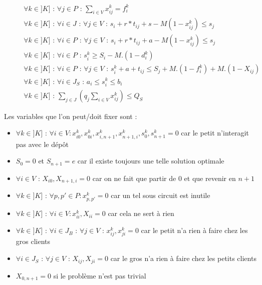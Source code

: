 \documentclass[12pt,a4paper,fleqn]{article}
\begin{document}
\begin{align}
& && \forall k \in ]K] \text{ : } \forall j \in P \text{ : } \sum \limits_{i \in V} x^k_{ij} = f^k_i \label{reveniraugros} \\
& && \forall k \in ]K] \text{ : } \forall i \in J \text{ : } \forall j \in V \text{ : } s_i + r*t_{ij} + s - M(1-x_{ij}^k) \leqslant s_j \label{sequentialitepetit1} \\
& && \forall k \in ]K] \text{ : } \forall i \in P \text{ : } \forall j \in V \text{ : } s_i + r*t_{ij} + a - M(1-x_{ij}^k) \leqslant s_j \label{sequentialitepetit2} \\
& && \forall k \in ]K] \text{ : } \forall i \in P \text{ : } s_i^k \geqslant S_i - M.(1 - d_i^k) \label{datedebutpetit} \\
& && \forall k \in ]K] \text{ : } \forall i \in P \text{ : } \forall j \in V \text{ : } s_i^k + a + t_{ij} \leqslant S_j + M.(1 - f^k_i) + M.(1 - X_{ij}) \label{datedefinpetit} \\
& && \forall k \in ]K] \text{ : } \forall i \in J_S \text{ : } a_i \leqslant s_i^k \leqslant b_i \label{fenetrepetit} \\
& && \forall k \in ]K] \text{ : } \sum \limits_{j \in J} (q_j \sum \limits_{i \in V} x^k_{ij}) \leqslant Q_S  \label{capa} 
\end{align}

\clearpage

Les variables que l'on peut/doit fixer sont :
\begin{itemize}
\item $\forall k \in ]K] \text{ : } \forall i \in V : x^k_{i0}, x^k_{0i}, x^k_{i,n+1}, x^k_{n+1,i}, s^k_0, s^k_{n+1} = 0$ car le petit n'interagit pas avec le dépôt
\item $S_0 = 0$ et $S_{n+1} = e$ car il existe toujours une telle solution optimale
\item $\forall i \in V \text{ : } X_{i0}, X_{n+1,i} = 0$ car on ne fait que partir de $0$ et que revenir en $n+1$
\item $\forall k \in ]K] \text{ : } \forall p,p' \in P : x^k_{p,p'} = 0$ car un tel sous circuit est inutile
\item $\forall k \in ]K] \text{ : } \forall i \in V : x^k_{ii}, X_{ii} = 0$ car cela ne sert à rien
\item $\forall k \in ]K] \text{ : } \forall i \in J_B \text{ : } \forall j \in V \text{ : } x^k_{ij}, x^k_{ji} = 0$ car le petit n'a rien à faire chez les gros clients
\item $\forall i \in J_S \text{ : } \forall j \in V \text{ : } X_{ij}, X_{ji} = 0$ car le gros n'a rien à faire chez les petits clients
\item $X_{0,n+1} = 0$ si le problème n'est pas trivial
\end{itemize}
\end{document}
